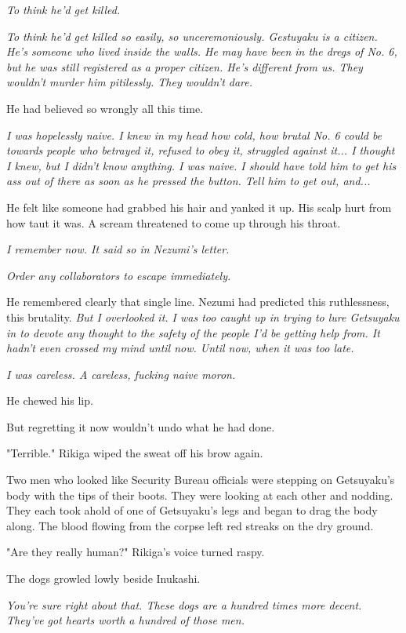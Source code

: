 \emph{To think he'd get killed.}

\emph{To think he'd get killed so easily, so unceremoniously. Gestuyaku is a
citizen. He's someone who lived inside the walls. He may have been in
the dregs of No. 6, but he was still registered as a proper citizen.
He's different from us. They wouldn't murder him pitilessly. They wouldn't dare.}

He had believed so wrongly all this time.

\emph{I was hopelessly naive. I knew in my head how cold, how brutal No. 6
could be towards people who betrayed it, refused to obey it, struggled
against it... I thought I knew, but I didn't know anything. I was naive.
I should have told him to get his ass out of there as soon as he pressed
the button. Tell him to get out, and...}

He felt like someone had grabbed his hair and yanked it up. His scalp
hurt from how taut it was. A scream threatened to come up through his
throat.

\emph{I remember now. It said so in Nezumi's letter.}

\emph{Order any collaborators to escape immediately.}

He remembered clearly that single line. Nezumi had predicted this
ruthlessness, this brutality. \emph{But I overlooked it. I was too caught up
in trying to lure Getsuyaku in to devote any thought to the safety of
the people I'd be getting help from. It hadn't even crossed my mind
until now. Until now, when it was too late.}

\emph{I was careless. A careless, fucking naive moron.}

He chewed his lip.

But regretting it now wouldn't undo what he had done.

"Terrible." Rikiga wiped the sweat off his brow again.

Two men who looked like Security Bureau officials were stepping on
Getsuyaku's body with the tips of their boots. They were looking at each
other and nodding. They each took ahold of one of Getsuyaku's legs and
began to drag the body along. The blood flowing from the corpse left red
streaks on the dry ground.

"Are they really human?" Rikiga's voice turned raspy.

The dogs growled lowly beside Inukashi.

\emph{You're sure right about that. These dogs are a hundred times more
decent. They've got hearts worth a hundred of those men.}


